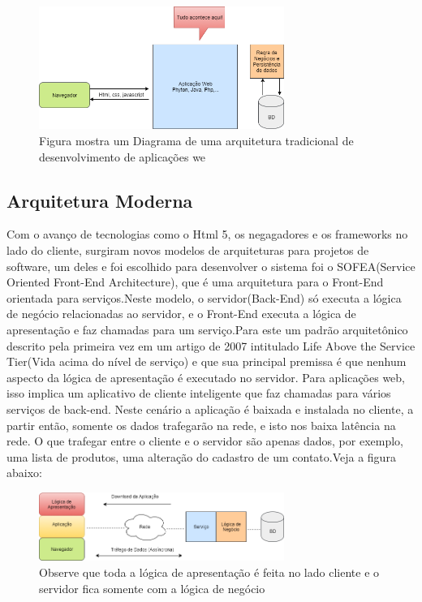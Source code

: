 \begin{figure}[!h]
\centering
\includegraphics[width=8cm]{Figuras/Cap1/arquitetura-tradicional.png}
\caption[]{Figura mostra um Diagrama de uma arquitetura tradicional de desenvolvimento de aplicações we} 
\end{figure}

\subsection{Arquitetura Moderna}
Com o avanço de tecnologias como o Html 5, os negagadores e os frameworks no lado do cliente, surgiram novos modelos de arquiteturas para projetos de software, um deles e foi escolhido para desenvolver o sistema foi o SOFEA(Service Oriented Front-End Architecture), que é uma arquitetura para o Front-End orientada para serviços.Neste modelo, o servidor(Back-End) só executa a lógica de negócio relacionadas ao servidor, e o Front-End executa a lógica de apresentação e faz chamadas para um serviço.Para \cite{Moepi} este um padrão arquitetônico descrito pela primeira vez em um artigo de 2007 intitulado Life Above the Service Tier(Vida acima do nível de serviço) e que sua principal premissa é que nenhum aspecto da lógica de apresentação é executado no servidor. Para aplicações web, isso implica um aplicativo de cliente inteligente que faz chamadas para vários serviços de back-end. Neste cenário a aplicação é baixada e instalada no cliente, a partir então, somente os dados trafegarão na rede, e isto nos baixa latência na rede. O que trafegar entre o cliente e o servidor são apenas dados, por exemplo, uma lista de produtos, uma alteração do cadastro de um contato.Veja a figura abaixo:

\begin{figure}[!h]
\centering
\includegraphics[width=8cm]{Figuras/Cap1/arquiteturaModerna.png}
\caption[]{Observe que toda a lógica de apresentação é feita no lado cliente e o servidor fica somente com a lógica de negócio} 
\end{figure}

